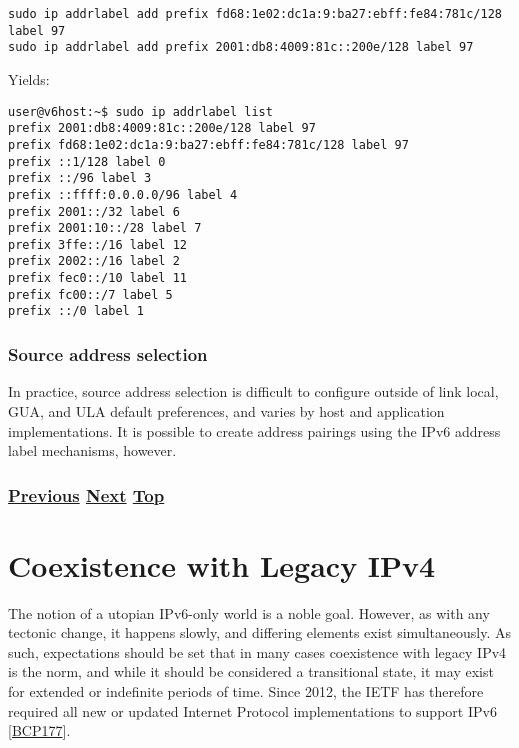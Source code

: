 \documentclass[
]{article}
\begin{document}
\begin{verbatim}
sudo ip addrlabel add prefix fd68:1e02:dc1a:9:ba27:ebff:fe84:781c/128 label 97
sudo ip addrlabel add prefix 2001:db8:4009:81c::200e/128 label 97
\end{verbatim}

Yields:

\begin{verbatim}
user@v6host:~$ sudo ip addrlabel list
prefix 2001:db8:4009:81c::200e/128 label 97
prefix fd68:1e02:dc1a:9:ba27:ebff:fe84:781c/128 label 97
prefix ::1/128 label 0
prefix ::/96 label 3
prefix ::ffff:0.0.0.0/96 label 4
prefix 2001::/32 label 6
prefix 2001:10::/28 label 7
prefix 3ffe::/16 label 12
prefix 2002::/16 label 2
prefix fec0::/10 label 11
prefix fc00::/7 label 5
prefix ::/0 label 1
\end{verbatim}

\subsubsection{Source address selection}\label{source-address-selection}

In practice, source address selection is difficult to configure outside
of link local, GUA, and ULA default preferences, and varies by host and
application implementations. It is possible to create address pairings
using the IPv6 address label mechanisms, however.

\subsubsection{\texorpdfstring{\hyperref[traffic-class-and-flow-label]{Previous}
\hyperref[coexistence-with-legacy-ipv4]{Next}
\hyperref[ipv6-basic-technology]{Top}}{Previous Next Top}}\label{previous-next-top-18}

\pagebreak

\section{Coexistence with Legacy
IPv4}\label{coexistence-with-legacy-ipv4}

The notion of a utopian IPv6-only world is a noble goal. However, as
with any tectonic change, it happens slowly, and differing elements
exist simultaneously. As such, expectations should be set that in many
cases coexistence with legacy IPv4 is the norm, and while it should be
considered a transitional state, it may exist for extended or indefinite
periods of time. Since 2012, the IETF has therefore required all new or
updated Internet Protocol implementations to support IPv6
{[}\href{https://www.rfc-editor.org/info/bcp177}{BCP177}{]}.
\end{document}
